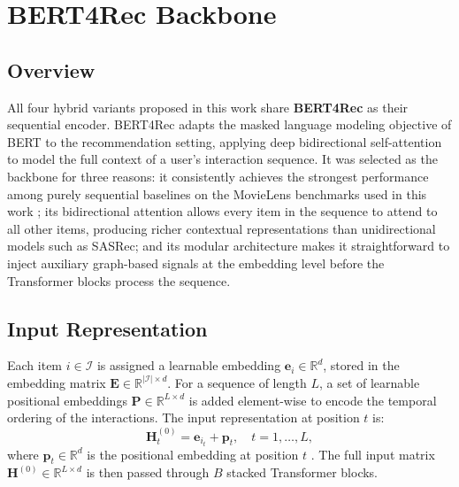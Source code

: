 \documentclass[12pt,a4paper]{report}
\newcommand{\parencite}[1]{\citep{#1}}
\begin{document}
\section{BERT4Rec Backbone}

\subsection{Overview}

All four hybrid variants proposed in this work share
\textbf{BERT4Rec} \parencite{sun2019bert4rec} as their sequential
encoder. BERT4Rec adapts the masked language modeling objective
of BERT to the recommendation setting, applying deep bidirectional
self-attention to model the full context of a user's interaction
sequence. It was selected as the backbone for three reasons: it
consistently achieves the strongest performance among purely
sequential baselines on the MovieLens benchmarks used in this
work \parencite{ouledmeriem2025hybrid}; its bidirectional attention
allows every item in the sequence to attend to all other items,
producing richer contextual representations than unidirectional
models such as SASRec; and its modular architecture makes it
straightforward to inject auxiliary graph-based signals at the
embedding level before the Transformer blocks process the sequence.

\subsection{Input Representation}

Each item $i \in \mathcal{I}$ is assigned a learnable embedding
$\mathbf{e}_i \in \mathbb{R}^d$, stored in the embedding matrix
$\mathbf{E} \in \mathbb{R}^{|\mathcal{I}| \times d}$. For a
sequence of length $L$, a set of learnable positional embeddings
$\mathbf{P} \in \mathbb{R}^{L \times d}$ is added element-wise to
encode the temporal ordering of the interactions. The input
representation at position $t$ is:
\begin{equation}
  \mathbf{H}_t^{(0)} = \mathbf{e}_{i_t} + \mathbf{p}_t,
  \quad t = 1, \ldots, L,
\end{equation}
where $\mathbf{p}_t \in \mathbb{R}^d$ is the positional embedding
at position $t$ \parencite{ouledmeriem2025hybrid}. The full input
matrix $\mathbf{H}^{(0)} \in \mathbb{R}^{L \times d}$ is then
passed through $B$ stacked Transformer blocks.
\end{document}
